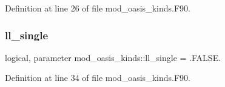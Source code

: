 Definition at line 26 of file mod\+\_\+oasis\+\_\+kinds.\+F90.

\mbox{\label{namespacemod__oasis__kinds_ae462c851305d5fe6ef6178c9dcac4468}} 
\subsubsection{\texorpdfstring{ll\+\_\+single}{ll\_single}}
{\footnotesize\ttfamily logical, parameter mod\+\_\+oasis\+\_\+kinds\+::ll\+\_\+single = .F\+A\+L\+S\+E.}



Definition at line 34 of file mod\+\_\+oasis\+\_\+kinds.\+F90.

